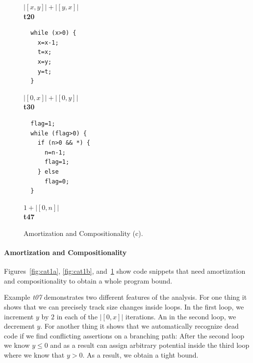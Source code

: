 \documentclass[nocopyrightspace,preprint,pldi]{sigplanconf-pldi15}
\begin{document}
{\begin{figure}
\begin{minipage}[b]{\progwidth}
\begin{center}
$|[x,y]|+|[y,x]|$
\\[.7\baselineskip]
      {\bf t20}
    \end{center}
  \end{minipage}%
%
%
  \begin{minipage}[b]{\progwidth}
    \begin{center}
   \begin{lstlisting}
  while (x>0) {
    x=x-1;
    t=x;
    x=y;
    y=t;
  }
   \end{lstlisting}

$|[0,x]|+|[0,y]|$
\\[.7\baselineskip]
      {\bf t30}
    \end{center}
  \end{minipage}
%
%
  \begin{minipage}[b]{\progwidth}
    \begin{center}
   \begin{lstlisting}
  flag=1;
  while (flag>0) {
    if (n>0 && *) {
      n=n-1;
      flag=1;
    } else
      flag=0;
  }
   \end{lstlisting}

$1 + |[0, n]|$
\\[.7\baselineskip]
      {\bf t47}
    \end{center}
  \end{minipage}

   \caption{Amortization and Compositionality (c).}
  \label{fig:cat1c}
\end{figure}

\paragraph{Amortization and Compositionality}

Figures~\ref{fig:cat1a}, \ref{fig:cat1b}, and~\ref{fig:cat1c} show
code snippets that need amortization and compositionality to obtain a
whole program bound.

Example \emph{t07} demonstrates two different features of the
analysis.  For one thing it shows that we can precisely track size
changes inside loops.  In the first loop, we increment $y$ by $2$ in
each of the $|[0,x]|$ iterations.  An in the second loop, we decrement
$y$.  For another thing it shows that we automatically recognize dead
code if we find conflicting assertions on a branching path: After the
second loop we know $y \leq 0$ and as a result can assign arbitrary
potential inside the third loop where we know that $y>0$.  As a
result, we obtain a tight bound.

}
\end{document}
